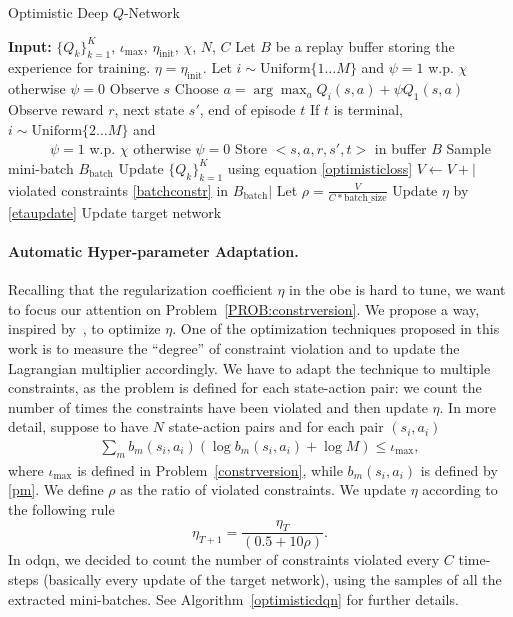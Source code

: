 \begin{algorithm}[t]
	\caption{Optimistic Deep $Q$-Network}
	\label{optimisticdqn}
	\begin{algorithmic}
		\STATE \textbf{Input:} $\{Q_k\}_{k=1}^K$, $\iota_{\max}$, $\eta_{\mathrm{init}}$, $\chi$, $N$, $C$
		\STATE Let $B$ be a replay buffer storing the experience for training.
		\STATE $\eta = \eta_{\mathrm{init}}$.
		\STATE Let $i \sim \mathrm{Uniform}\{1 \dots M\}$ and $\psi = 1$ w.p. $\chi$ otherwise $\psi = 0$
		\STATE Observe $s$
		\STATE Choose $a = \arg \max_a Q_i(s,a) + \psi Q_1(s,a)$
		\STATE Observe reward $r$, next state $s'$, end of episode $t$
		\STATE If $t$ is terminal, $i \sim \mathrm{Uniform}\{2 \dots M\}$ and \\ \ \ \ \ \ \ $\psi = 1$ w.p. $\chi$ otherwise $\psi=0$
		\STATE Store $<s,a,r,s',t>$ in buffer $B$
		\STATE Sample mini-batch $B_{\mathrm{batch}}$
		\STATE Update $\{Q_k\}_{k=1}^K$ using equation \eqref{optimisticloss}
		\STATE $V \leftarrow V + |$ violated constraints \eqref{batchconstr} in $B_{\mathrm{batch}}|$ 
		\ENDFOR
		\STATE Let $\rho = \frac{V}{C * \mathrm{batch\_size}}$
		\STATE Update $\eta$ by \eqref{etaupdate}
		\STATE Update target network
		\ENDFOR
	\end{algorithmic}
\end{algorithm}

\paragraph{Automatic Hyper-parameter Adaptation.}
\label{subsec:adaptive}
Recalling that the regularization coefficient $\eta$ in the \gls{obe} is hard to tune, we want to focus our attention on Problem~\ref{PROB:constrversion}. We propose a way, inspired by~\cite{schulman2017proximal}, to optimize $\eta$.
One of the optimization techniques proposed in this work is to measure the ``degree'' of constraint violation and to update the Lagrangian multiplier accordingly. We have to adapt the technique to multiple constraints, as the problem is defined for each state-action pair: we count the number of times the constraints have been violated and then update $\eta$. In more detail, suppose to have $N$ state-action pairs and for each pair $(s_i, a_i)$
\begin{eqnarray}
\sum_m b_m(s_i,a_i) (\log b_m(s_i,a_i) + \log M) \leq \iota_{\max}, \label{batchconstr}
\end{eqnarray}
where $\iota_{\max}$ is defined in Problem~\ref{constrversion}, while $b_m(s_i,a_i)$ is defined by \eqref{pm}. We define $\rho$ as the ratio of violated constraints. We update $\eta$ according to the following rule
\begin{equation}
\eta_{T+1} = \frac{\eta_{T}}{(0.5 +  10 \rho)} \label{etaupdate}.
\end{equation}
In \gls{odqn}, we decided to count the number of constraints violated every $C$ time-steps (basically every update of the target network), using the samples of all the extracted mini-batches. See Algorithm~\ref{optimisticdqn} for further details.  
  
